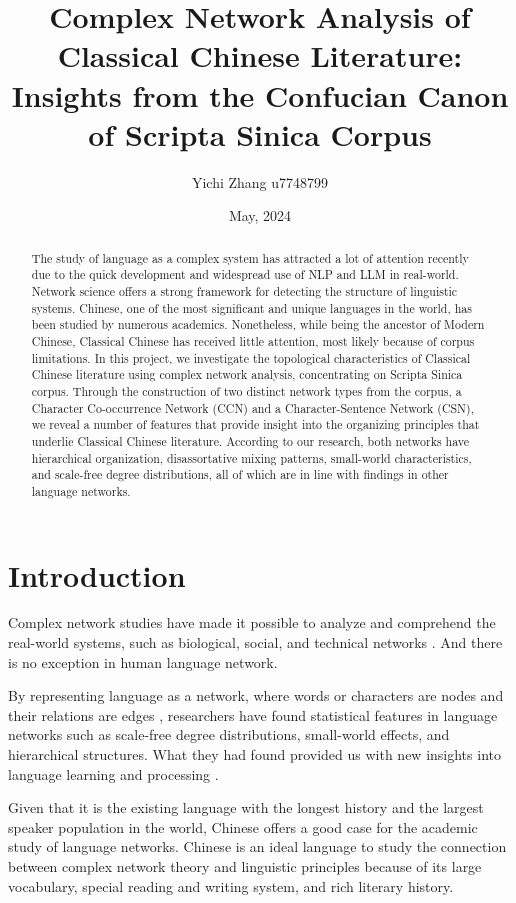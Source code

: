 \documentclass[11pt]{article}
\title{Complex Network Analysis of Classical Chinese Literature: Insights from the Confucian Canon of Scripta Sinica Corpus}
\author{Yichi Zhang u7748799}
\date{May, 2024}
\begin{document}
\maketitle

\begin{abstract}
    The study of language as a complex system has attracted a lot of attention recently due to the quick development and widespread use of NLP and LLM in real-world. Network science offers a strong framework for detecting the structure of linguistic systems. Chinese, one of the most significant and unique languages in the world, has been studied by numerous academics. Nonetheless, while being the ancestor of Modern Chinese, Classical Chinese has received little attention, most likely because of corpus limitations. In this project, we investigate the topological characteristics of Classical Chinese literature using complex network analysis, concentrating on Scripta Sinica corpus. Through the construction of two distinct network types from the corpus, a Character Co-occurrence Network (CCN) and a Character-Sentence Network (CSN), we reveal a number of features that provide insight into the organizing principles that underlie Classical Chinese literature. According to our research, both networks have hierarchical organization, disassortative mixing patterns, small-world characteristics, and scale-free degree distributions, all of which are in line with findings in other language networks. 
\end{abstract}

\section{Introduction}
Complex network studies have made it possible to analyze and comprehend the real-world systems, such as biological, social, and technical networks \cite{costa2007characterization}. And there is no exception in human language network. 

By representing language as a network, where words or characters are nodes and their relations are edges \cite{ferrer2004patterns}, researchers have found statistical features in language networks such as scale-free degree distributions, small-world effects, and hierarchical structures. What they had found provided us with new insights into language learning and processing \cite{baronchelli2013networks}.

Given that it is the existing language with the longest history and the largest speaker population in the world, Chinese offers a good case for the academic study of language networks. Chinese is an ideal language to study the connection between complex network theory and linguistic principles because of its large vocabulary, special reading and writing system, and rich literary history.
\end{document}
